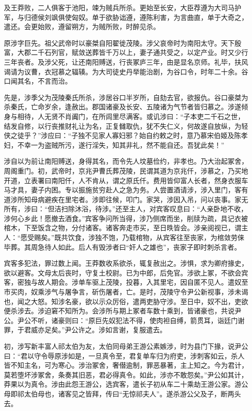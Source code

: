 \documentclass[]{article}
\begin{document}
及王莽败，二人俱客于池阳，竦为贼兵所杀。更始至长安，大臣荐遵为大司马护军，与归德侯刘飒俱使匈奴。单于欲胁诎遵，遵陈利害，为言曲直，单于大奇之，遣还。会更始败，遵留朔方，为贼所败，时醉见杀。

原涉字巨先。祖父武帝时以豪桀自阳翟徙茂陵。涉父哀帝时为南阳太守。天下殷富，大郡二千石列官，赋敛送葬皆千万以上，妻子通共受之，以定产业。时又少行三年丧者。及涉父死，让还南阳赙送，行丧冢庐三年，由是显名京师。礼毕，扶风谒请为议曹，衣冠慕之辐辏。为大司徒史丹举能治剧，为谷口令，时年二十余。谷口闻其名，不言而治。

先是，涉季父为茂陵秦氏所杀，涉居谷口半岁所，自劾去官，欲报仇。谷口豪桀为杀秦氏，亡命岁余，逢赦出。郡国诸豪及长安、五陵诸为气节者皆归慕之。涉遂倾身与相待，人无贤不肖阗门，在所闾里尽满客。或讥涉曰：``子本吏二千石之世，结发自修，以行丧推财礼让为名，正复雠取仇，犹不失仁义，何故遂自放纵，为轻侠之徒乎？''涉应曰：``子独不见家人寡妇邪？始自约敕之时，意乃慕宋伯姬及陈孝妇，不幸一为盗贼所污，遂行淫失，知其非礼，然不能自还。吾犹此矣！''

涉自以为前让南阳赙送，身得其名，而令先人坟墓俭约，非孝也。乃大治起冢舍，周阁重门。初，武帝时，京兆尹曹氏葬茂陵，民谓其道为京兆仟，涉慕之，乃买地开道，立表署曰南阳仟，人不肯从，谓之原氏仟。费用皆仰富人长者，然身衣服车马才具，妻子内困。专以振施贫穷赴人之急为务。人尝置酒请涉，涉入里门，客有道涉所知母病避疾在里宅者。涉即往候，叩门。家哭，涉因入吊，问以丧事。家无所有，涉曰：``但洁扫除沐浴，待涉。''还至主人，对宾客叹息曰：``人亲卧地不收，涉何心乡此！愿撤去酒食。''宾客争问所当得，涉乃侧席而坐，削牍为疏，具记衣被棺木，下至饭含之物，分付诸客。诸客奔走市买，至日昳皆会。涉亲阅视已，谓主人：``愿受赐矣。''既共饮食，涉独不饱，乃载棺物，从宾客往至丧家，为棺敛劳俫毕葬。其周急待人如此。后人有毁涉者曰``奸人之雄也''，丧家子即时刺杀言者。

宾客多犯法，罪过数上闻。王莽数收系欲杀，辄复赦出之。涉惧，求为卿府掾史，欲以避客。文母太后丧时，守复土校尉。已为中郎，后免官。涉欲上冢，不欲会宾客，密独与故人期会。涉单车驱上茂陵，投暮，入其里宅，因自匿不见人。遣奴至市买肉，奴乘涉气与屠争言，斫伤屠者，亡。是时，茂陵守令尹公新视事，涉未谒也，闻之大怒。知涉名豪，欲以示众厉俗，遣两吏胁守涉。至日中，奴不出，吏欲便杀涉去。涉迫窘不知所为。会涉所与期上冢者车数十乘到，皆诸豪也，共说尹公。尹公不听，诸豪则曰：``原巨先奴犯法不得，使肉袒自缚，箭贯耳，诣廷门谢罪，于君威亦足矣。''尹公许之。涉如言谢，复服遣去。

初，涉写新丰富人祁太伯为友，太伯同母弟王游公素嫉涉，时为县门下掾，说尹公曰：``君以守令辱原涉如是，一旦真令至，君复单车归为府吏，涉刺客如云，杀人皆不知主名，可为寒心。涉治冢舍，奢僣逾制，罪恶暴著，主上知之。今为君计，莫若堕坏涉冢舍，条奏其旧恶，君必得真令。如此，涉亦不敢怨矣。''尹公如其计，莽果以为真令。涉由此怨王游公，选宾客，遣长子初从车二十乘劫王游公家。游公母即祁太伯母也，诸客见之皆拜，传曰``无惊祁夫人''。遂杀游公父及子，断两头去。
\end{document}
